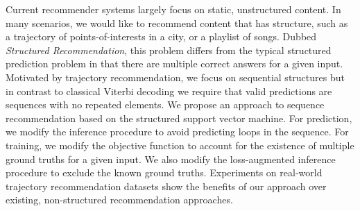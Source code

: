 
Current recommender systems largely focus on static, unstructured content.
In many scenarios, we would like to recommend content that has structure,
such as %
a trajectory of points-of-interests in a city, or a playlist of songs.
Dubbed {\em Structured Recommendation},
this problem differs from the typical structured prediction problem
in that there are multiple correct answers for a given input.
Motivated by trajectory recommendation, we focus on sequential structures
but in contrast to classical Viterbi decoding we require that
valid predictions are sequences with no repeated elements.
We propose an approach to sequence recommendation based on the structured support vector machine.
For prediction, we modify the inference procedure to avoid predicting loops in the sequence.
For training, we modify the objective function to account for the existence of multiple ground truths for a given input. We also modify the loss-augmented inference procedure to exclude the known ground truths.
Experiments on real-world trajectory recommendation datasets show the benefits of our approach over existing, non-structured recommendation approaches.
